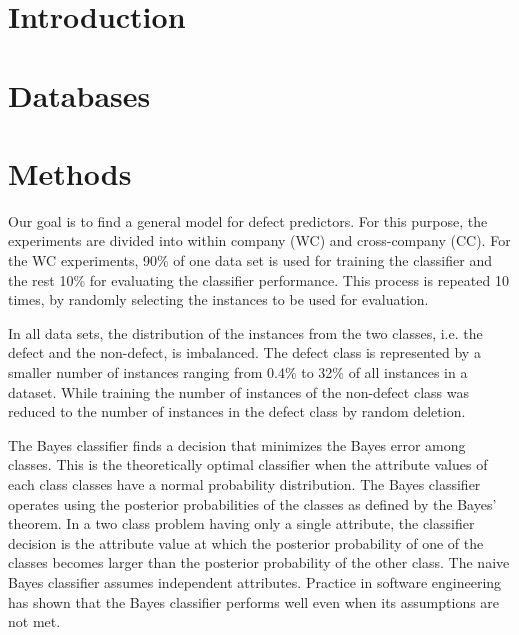 \documentclass{sig-alternate}
\begin{document}
\maketitle
\begin{abstract}
\end {abstract}


\section{Introduction}
\section{Databases}


\section{Methods}
Our goal is to find a general model for defect predictors. For this purpose, the experiments are divided into  
within company (WC) and cross-company (CC). For the WC experiments, 90\% of one data set 
is used for training the classifier and the rest 10\% for evaluating the classifier performance. This process is 
repeated 10 times, by randomly selecting the instances to be used for evaluation. 

In all data sets, the distribution of the instances from the two classes, i.e. the defect and the 
non-defect, is imbalanced. The defect class is represented by a smaller number of instances 
 ranging  from 0.4\% to 32\% of all instances in a dataset. While training the number of instances of the 
 non-defect class was reduced to the number of instances in the defect class by random deletion. 

The Bayes classifier finds a decision that minimizes the Bayes error among classes. This is the 
theoretically optimal classifier when the attribute values of each class classes have a normal probability 
distribution. The Bayes classifier operates using the posterior probabilities of the classes as defined by 
the Bayes' theorem. In a two class problem having only a single attribute, the classifier decision is the 
attribute value at which the posterior probability of one of the classes becomes larger than the posterior 
probability of the other class. The naive Bayes classifier assumes independent attributes. 
Practice in software engineering has shown that the Bayes classifier performs well even when its 
assumptions are not met. 
\end{document}
